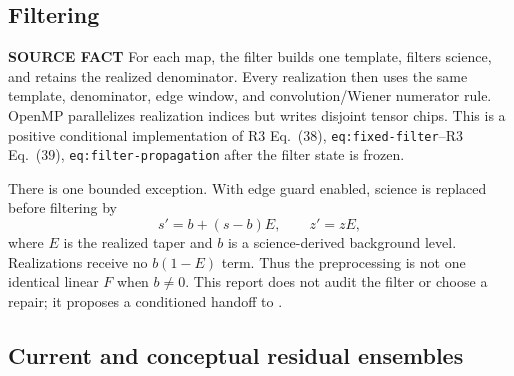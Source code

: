 \documentclass[10pt]{article}
\newcommand{\srclabel}{\textbf{SOURCE FACT}}
\newcommand{\rthree}[2]{R3 Eq.~(#1), \texttt{#2}}
\begin{document}
\subsection{Filtering}

\srclabel{} For each map, the filter builds one template, filters science, and
retains the realized denominator.  Every realization then uses the same
template, denominator, edge window, and convolution/Wiener numerator rule.
OpenMP parallelizes realization indices but writes disjoint tensor chips.
This is a positive conditional implementation of
\rthree{38}{eq:fixed-filter}--\rthree{39}{eq:filter-propagation} after the
filter state is frozen.

There is one bounded exception.  With edge guard enabled, science is replaced
before filtering by
\begin{equation}
  s' = b + (s-b)E,
  \qquad z' = zE,
  \label{eq:edge-asymmetry}
\end{equation}
where $E$ is the realized taper and $b$ is a science-derived background
level.  Realizations receive no $b(1-E)$ term.  Thus the preprocessing is not
one identical linear $F$ when $b\ne0$.  This report does not audit the filter
or choose a repair; it proposes a conditioned handoff to .

\subsection{Current and conceptual residual ensembles}
\end{document}
